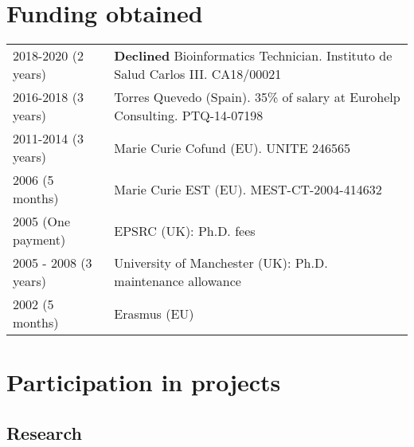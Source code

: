 \documentclass[11pt,fullpage]{article}
\begin{document}
\section*{Funding obtained}

\begin{tabular}{ll}
  2018-2020 (2 years) & {\bf Declined} Bioinformatics Technician. Instituto de Salud Carlos III. CA18/00021 \\
  2016-2018 (3 years) & Torres Quevedo (Spain). 35\% of salary at Eurohelp Consulting. PTQ-14-07198 \\
	2011-2014 (3 years) & Marie Curie Cofund (EU). UNITE 246565 \\
	2006 (5 months) & Marie Curie EST (EU). MEST-CT-2004-414632 \\
	2005 (One payment) & EPSRC (UK): Ph.D. fees \\
	2005 - 2008 (3 years) & University of Manchester (UK): Ph.D. maintenance allowance \\
	2002 (5 months) & Erasmus (EU) \\
\end{tabular}

\section*{Participation in projects}

\subsection*{Research}
\end{document}
